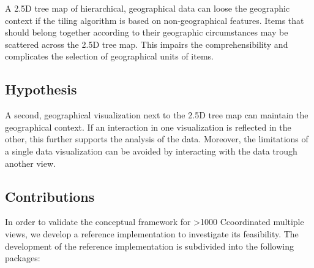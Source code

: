 \documentclass{article}
\newcommand\hmm[1]{\ifnum\ifhmode\spacefactor\else2000\fi>1000 \uppercase{#1}\else#1\fi}
\newcommand{\cmvs}{\hmm{c}oordinated multiple views}
\newcommand{\tmap}{\textsc{2.5D} tree map}
\begin{document}
A \tmap{} of hierarchical, geographical data can loose the geographic context if the tiling algorithm is based on non-geographical features.
Items that should belong together according to their geographic circumstances may be scattered across the \tmap{}.
This impairs the comprehensibility and complicates the selection of geographical units of items.

\subsection{Hypothesis}

A second, geographical visualization next to the \tmap{} can maintain the geographical context.
If an interaction in one visualization is reflected in the other, this further supports the analysis of the data.
Moreover, the limitations of a single data visualization can be avoided by interacting with the data trough another view.


\subsection{Contributions}

In order to validate the conceptual framework for \cmvs{}, we develop a reference implementation to investigate its feasibility.
The development of the reference implementation is subdivided into the following packages:
\end{document}

